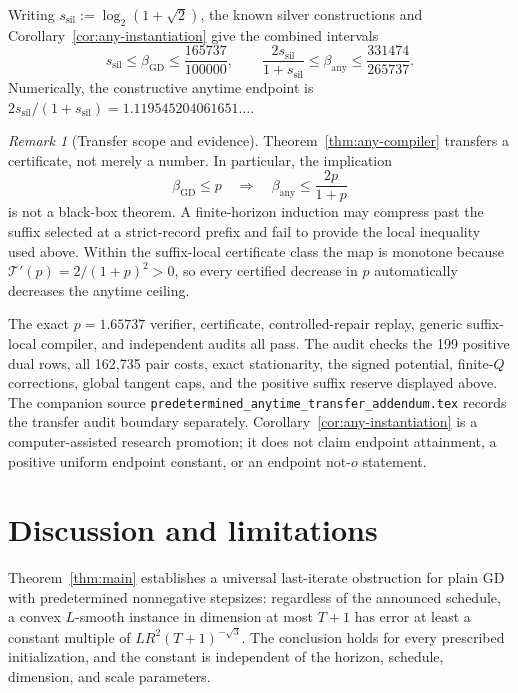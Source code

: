\documentclass[11pt]{article}
\theoremstyle{definition}
\theoremstyle{remark}
\newtheorem{remark}[theorem]{Remark}
\newcommand{\gdexp}{\beta_{\mathrm{GD}}}
\newcommand{\anyexp}{\beta_{\mathrm{any}}}
\newcommand{\Transfer}{\mathcal T}
\newcommand{\silver}{\mathrm{sil}}
\begin{document}
Writing \(s_\silver:=\log_2(1+\sqrt2)\), the known silver constructions
and Corollary~\ref{cor:any-instantiation} give the combined intervals
\begin{equation}
 \boxed{
 s_\silver\le\gdexp\le\frac{165737}{100000},
 \qquad
 \frac{2s_\silver}{1+s_\silver}
 \le\anyexp\le\frac{331474}{265737}.}
 \label{eq:any-intervals}
\end{equation}
Numerically, the constructive anytime endpoint is
\(2s_\silver/(1+s_\silver)=1.119545204061651\ldots\).

\begin{remark}[Transfer scope and evidence]
\label{rem:any-scope}
Theorem~\ref{thm:any-compiler} transfers a certificate, not merely a number.
In particular, the implication
\[
 \gdexp\le p
 \quad\Longrightarrow\quad
 \anyexp\le\frac{2p}{1+p}
\]
is not a black-box theorem.  A finite-horizon induction may compress past the
suffix selected at a strict-record prefix and fail to provide the local
inequality used above.  Within the suffix-local certificate class the map is
monotone because \(\Transfer'(p)=2/(1+p)^2>0\), so every certified decrease
in \(p\) automatically decreases the anytime ceiling.

The exact \(p=1.65737\) verifier, certificate, controlled-repair replay,
generic suffix-local compiler, and independent audits all pass.  The audit
checks the 199 positive dual rows, all 162,735 pair costs, exact stationarity,
the signed potential, finite-\(Q\) corrections, global tangent caps, and the
positive suffix reserve displayed above.  The companion source
\texttt{predetermined\_anytime\_transfer\_addendum.tex} records the transfer
audit boundary separately.  Corollary~\ref{cor:any-instantiation}
is a computer-assisted research promotion; it does not claim endpoint
attainment, a positive uniform endpoint constant, or an endpoint
\(\mathrm{not}\text{-}o\) statement.
\end{remark}

\section{Discussion and limitations}
\label{sec:limitations}

Theorem~\ref{thm:main} establishes a universal last-iterate obstruction for
plain GD with predetermined nonnegative stepsizes: regardless of the
announced schedule, a convex \(L\)-smooth instance in dimension at most
\(T+1\) has error at least a constant multiple of
\(LR^2(T+1)^{-\sqrt3}\).  The conclusion holds for every prescribed
initialization, and the constant is independent of the horizon, schedule,
dimension, and scale parameters.
\end{document}
